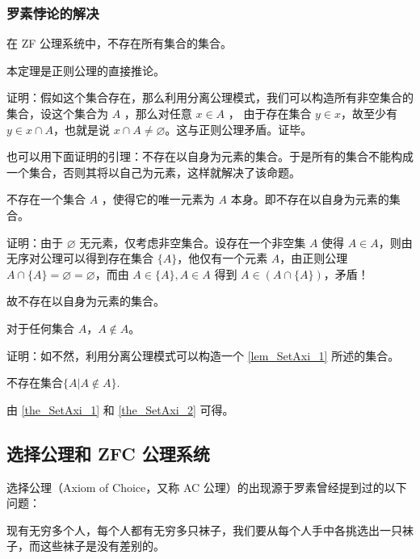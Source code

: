 \subsubsection{罗素悖论的解决}
\begin{theorem}{}
在 ZF 公\label{the_SetAxi_1}理系统中，不存在所有集合的集合。
\end{theorem}

本定理是正则公理的直接推论。

证明：假如这个集合存在，那么利用分离公理模式，我们可以构造所有非空集合的集合，设这个集合为 $A$ ，那么对任意 $x\in A$ ， 由于存在集合 $y\in x$，故至少有 $y\in x\cap A$，也就是说 $x\cap A\neq\varnothing$。这与正则公理矛盾。证毕。

也可以用下面证明的引理：不存在以自身为元素的集合。于是所有的集合不能构成一个集合，否则其将以自己为元素，这样就解决了该命题。

\begin{lemma}{}\label{lem_SetAxi_1}
不存在一个集合 $A$ ，使得它的唯一元素为 $A$ 本身。即不存在以自身为元素的集合。
\end{lemma}

证明：由于 $\varnothing$ 无元素，仅考虑非空集合。设存在一个非空集 $A$ 使得 $A \in A$，则由无序对公理可以得到存在集合 $\{A\}$，他仅有一个元素 $A$，由正则公理 $A\cap \{A\} = \varnothing = \varnothing$，而由 $A \in \{A\}, A \in A$ 得到 $A \in (A \cap \{A\})$，矛盾！

故不存在以自身为元素的集合。

\begin{theorem}{}\label{the_SetAxi_2}
对于任何集合 $A$，$A\notin A$。
\end{theorem}

证明：如不然，利用分离公理模式可以构造一个 \autoref{lem_SetAxi_1} 所述的集合。

\begin{theorem}{}
不存在集合$\{A|A\notin A\}$.
\end{theorem}

由 \autoref{the_SetAxi_1} 和 \autoref{the_SetAxi_2} 可得。

\subsection{选择公理和 ZFC 公理系统}

选择公理（Axiom of Choice，又称 AC 公理）的出现源于罗素曾经提到过的以下问题：

现有无穷多个人，每个人都有无穷多只袜子，我们要从每个人手中各挑选出一只袜子，而这些袜子是没有差别的。

